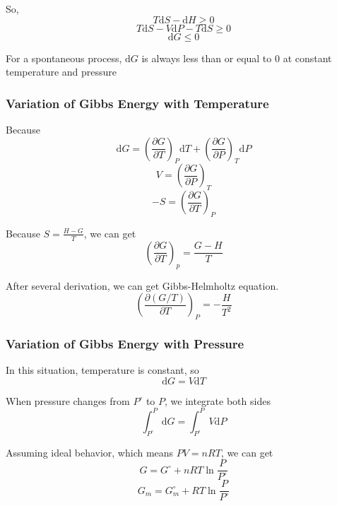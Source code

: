 \documentclass[letterpaper]{article}
\newcommand{\diff}{\mathrm{d}}
\newcommand{\zero}{^\circ}
\begin{document}
So,
\begin{equation*}
    T\diff S-\diff H\geq0
\end{equation*}
\begin{equation*}
    T\diff S-V\diff P-T\diff S\geq0
\end{equation*}
\begin{equation*}
    \diff G\leq0
\end{equation*}

For a spontaneous process, $\diff G$ is always less than or equal to 0 at constant temperature and pressure

\subsubsection*{Variation of Gibbs Energy with Temperature}
Because
\begin{equation*}
    \diff G=\left(\frac{\partial G}{\partial T}\right)_P\diff T+\left(\frac{\partial G}{\partial P}\right)_T\diff P
\end{equation*}
\begin{equation*}
    V=\left(\frac{\partial G}{\partial P}\right)_T
\end{equation*}
\begin{equation*}
    -S=\left(\frac{\partial G}{\partial T}\right)_P
\end{equation*}

Because $S=\frac{H-G}{T}$, we can get
\begin{equation*}
    \left(\frac{\partial G}{\partial T}\right)_p=\frac{G-H}{T}
\end{equation*}

After several derivation, we can get Gibbs-Helmholtz equation.
\begin{equation*}
    \boxed{\left(\frac{\partial (G/T)}{\partial T}\right)_P=-\frac{H}{T^2}}
\end{equation*}

\subsubsection*{Variation of Gibbs Energy with Pressure}
In this situation, temperature is constant, so
\begin{equation*}
    \diff G=V\diff T
\end{equation*}

When pressure changes from $P\zero$ to $P$, we integrate both sides
\begin{equation*}
    \int_{P\zero}^{P}\diff G=\int_{P\zero}^{P}V\diff P
\end{equation*}

Assuming ideal behavior, which means $PV=nRT$, we can get
\begin{equation*}
    G=G\zero + nRT\ln\frac{P}{P\zero}
\end{equation*}
\begin{equation*}
    G_m=G_m\zero+RT\ln\frac{P}{P\zero}
\end{equation*}
\end{document}
